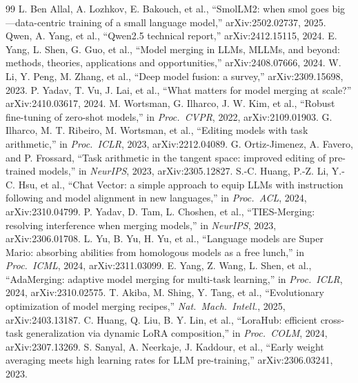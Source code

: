 \documentclass[conference]{IEEEtran}
\begin{document}
\begin{thebibliography}{99}
 L. Ben Allal, A. Lozhkov, E. Bakouch, et al., ``SmolLM2: when smol goes big---data-centric training of a small language model,'' arXiv:2502.02737, 2025.
 Qwen, A. Yang, et al., ``Qwen2.5 technical report,'' arXiv:2412.15115, 2024.
 E. Yang, L. Shen, G. Guo, et al., ``Model merging in LLMs, MLLMs, and beyond: methods, theories, applications and opportunities,'' arXiv:2408.07666, 2024.
 W. Li, Y. Peng, M. Zhang, et al., ``Deep model fusion: a survey,'' arXiv:2309.15698, 2023.
 P. Yadav, T. Vu, J. Lai, et al., ``What matters for model merging at scale?'' arXiv:2410.03617, 2024.
 M. Wortsman, G. Ilharco, J. W. Kim, et al., ``Robust fine-tuning of zero-shot models,'' in \emph{Proc.\ CVPR}, 2022, arXiv:2109.01903.
 G. Ilharco, M. T. Ribeiro, M. Wortsman, et al., ``Editing models with task arithmetic,'' in \emph{Proc.\ ICLR}, 2023, arXiv:2212.04089.
 G. Ortiz-Jimenez, A. Favero, and P. Frossard, ``Task arithmetic in the tangent space: improved editing of pre-trained models,'' in \emph{NeurIPS}, 2023, arXiv:2305.12827.
 S.-C. Huang, P.-Z. Li, Y.-C. Hsu, et al., ``Chat Vector: a simple approach to equip LLMs with instruction following and model alignment in new languages,'' in \emph{Proc.\ ACL}, 2024, arXiv:2310.04799.
 P. Yadav, D. Tam, L. Choshen, et al., ``TIES-Merging: resolving interference when merging models,'' in \emph{NeurIPS}, 2023, arXiv:2306.01708.
 L. Yu, B. Yu, H. Yu, et al., ``Language models are Super Mario: absorbing abilities from homologous models as a free lunch,'' in \emph{Proc.\ ICML}, 2024, arXiv:2311.03099.
 E. Yang, Z. Wang, L. Shen, et al., ``AdaMerging: adaptive model merging for multi-task learning,'' in \emph{Proc.\ ICLR}, 2024, arXiv:2310.02575.
 T. Akiba, M. Shing, Y. Tang, et al., ``Evolutionary optimization of model merging recipes,'' \emph{Nat.\ Mach.\ Intell.}, 2025, arXiv:2403.13187.
 C. Huang, Q. Liu, B. Y. Lin, et al., ``LoraHub: efficient cross-task generalization via dynamic LoRA composition,'' in \emph{Proc.\ COLM}, 2024, arXiv:2307.13269.
 S. Sanyal, A. Neerkaje, J. Kaddour, et al., ``Early weight averaging meets high learning rates for LLM pre-training,'' arXiv:2306.03241, 2023.

\end{thebibliography}
\end{document}
